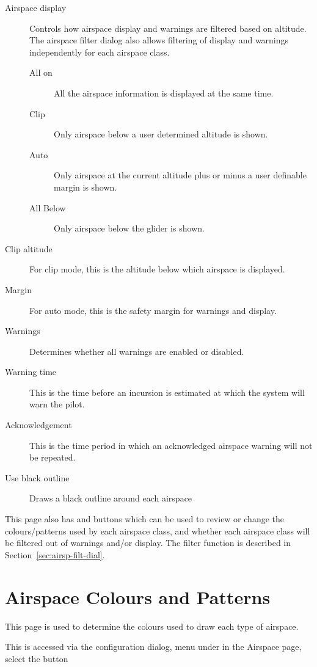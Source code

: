 \documentclass[a4paper,12pt]{refrep}
\begin{document}
\begin{description}
\item[Airspace display] Controls how airspace display and warnings are filtered based on altitude.  The airspace filter dialog also allows filtering
 of display and warnings independently for each airspace class.
\begin{description}
\item[All on] All the airspace information is displayed at the same time.
\item[Clip] Only airspace below a user determined altitude is shown.
\item[Auto] Only airspace at the current altitude plus or minus a user definable margin is shown.
\item[All Below]  Only airspace below the glider is shown.
\end{description}
\item[Clip altitude] For clip mode, this is the altitude below which airspace is displayed.
\item[Margin] For auto mode, this is the safety margin for warnings and display.
\item[Warnings] Determines whether all warnings are enabled or disabled.
\item[Warning time]  This is the time before an incursion is estimated at
  which the system will warn the pilot.
\item[Acknowledgement]  This is the time period in which an acknowledged airspace warning will not be repeated.
\item[Use black outline] Draws a black outline around each airspace
\end{description}

This page also has  and  buttons which
can be used to review or change the colours/patterns used by each
airspace class, and whether each airspace class will be filtered out
of warnings and/or display.  The filter function is described in
Section~\ref{sec:airsp-filt-dial}.

\clearpage
\section{Airspace Colours and Patterns}

This page is used to determine the colours used to draw each type of
airspace.

This is accessed via the configuration dialog, menu under
\blink{} in the Airspace page, select the
button 
\end{document}
